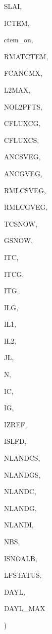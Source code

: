 {\begin{DoxyParamCaption}
\item[{real, dimension(ilg,ictem)}]{S\+L\+A\+I, }
\item[{integer}]{I\+C\+T\+E\+M, }
\item[{logical}]{ctem\+\_\+on, }
\item[{real, dimension(ilg,ictem,ig)}]{R\+M\+A\+T\+C\+T\+E\+M, }
\item[{real, dimension(ilg,ictem)}]{F\+C\+A\+N\+C\+M\+X, }
\item[{integer}]{L2\+M\+A\+X, }
\item[{integer, dimension(ic)}]{N\+O\+L2\+P\+F\+T\+S, }
\item[{real, dimension(ilg)}]{C\+F\+L\+U\+X\+C\+G, }
\item[{real, dimension(ilg)}]{C\+F\+L\+U\+X\+C\+S, }
\item[{real, dimension(ilg,ictem)}]{A\+N\+C\+S\+V\+E\+G, }
\item[{real, dimension(ilg,ictem)}]{A\+N\+C\+G\+V\+E\+G, }
\item[{real, dimension(ilg,ictem)}]{R\+M\+L\+C\+S\+V\+E\+G, }
\item[{real, dimension(ilg,ictem)}]{R\+M\+L\+C\+G\+V\+E\+G, }
\item[{real, dimension(ilg)}]{T\+C\+S\+N\+O\+W, }
\item[{real, dimension(ilg)}]{G\+S\+N\+O\+W, }
\item[{integer}]{I\+T\+C, }
\item[{integer}]{I\+T\+C\+G, }
\item[{integer}]{I\+T\+G, }
\item[{integer}]{I\+L\+G, }
\item[{integer}]{I\+L1, }
\item[{integer}]{I\+L2, }
\item[{integer}]{J\+L, }
\item[{integer}]{N, }
\item[{integer}]{I\+C, }
\item[{integer}]{I\+G, }
\item[{integer}]{I\+Z\+R\+E\+F, }
\item[{integer}]{I\+S\+L\+F\+D, }
\item[{integer}]{N\+L\+A\+N\+D\+C\+S, }
\item[{integer}]{N\+L\+A\+N\+D\+G\+S, }
\item[{integer}]{N\+L\+A\+N\+D\+C, }
\item[{integer}]{N\+L\+A\+N\+D\+G, }
\item[{integer}]{N\+L\+A\+N\+D\+I, }
\item[{integer}]{N\+B\+S, }
\item[{integer}]{I\+S\+N\+O\+A\+L\+B, }
\item[{integer, dimension(ilg,ictem)}]{L\+F\+S\+T\+A\+T\+U\+S, }
\item[{real, dimension(ilg)}]{D\+A\+Y\+L, }
\item[{real, dimension(ilg)}]{D\+A\+Y\+L\+\_\+\+M\+A\+X}
\end{DoxyParamCaption}
)}\label{CLASST_8f_a676b19c50cb1465a40c967d75168a72f}

